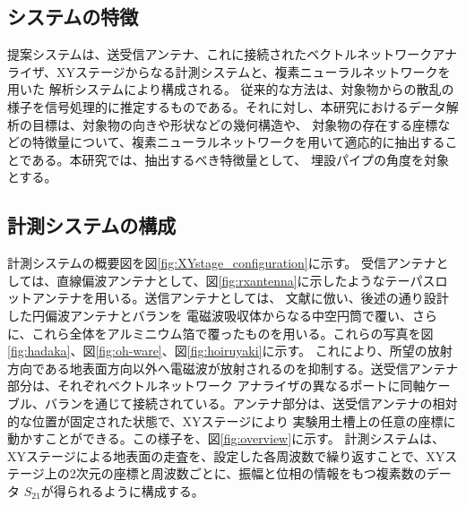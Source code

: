 \documentclass[11pt,a4paper,uplatex]{ujarticle}
\begin{document}
  
  \subsection{システムの特徴}
    
    提案システムは、送受信アンテナ、これに接続されたベクトルネットワークアナライザ、XYステージからなる計測システムと、複素ニューラルネットワークを用いた
    解析システムにより構成される。
    従来的な方法は、対象物からの散乱の様子を信号処理的に推定するものである。それに対し、本研究におけるデータ解析の目標は、対象物の向きや形状などの幾何構造や、
    対象物の存在する座標などの特徴量について、複素ニューラルネットワークを用いて適応的に抽出することである。本研究では、抽出するべき特徴量として、
    埋設パイプの角度を対象とする。

  \subsection{計測システムの構成}

    計測システムの概要図を図\ref{fig:XYstage_configuration}に示す。
    受信アンテナとしては、直線偏波アンテナとして、図\ref{fig:rxantenna}に示したようなテーパスロットアンテナを用いる。送信アンテナとしては、
    文献\cite{absorbing_material}に倣い、後述の通り設計した円偏波アンテナとバランを
    電磁波吸収体からなる中空円筒で覆い、さらに、これら全体をアルミニウム箔で覆ったものを用いる。これらの写真を図\ref{fig:hadaka}、図\ref{fig:oh-ware}、図\ref{fig:hoiruyaki}に示す。
    これにより、所望の放射方向である地表面方向以外へ電磁波が放射されるのを抑制する。送受信アンテナ部分は、それぞれベクトルネットワーク
    アナライザの異なるポートに同軸ケーブル、バランを通じて接続されている。アンテナ部分は、送受信アンテナの相対的な位置が固定された状態で、XYステージにより
    実験用土槽上の任意の座標に動かすことができる。この様子を、図\ref{fig:overview}に示す。
    計測システムは、XYステージによる地表面の走査を、設定した各周波数で繰り返すことで、XYステージ上の2次元の座標と周波数ごとに、振幅と位相の情報をもつ複素数のデータ
    $S_{21}$が得られるように構成する。
\end{document}
